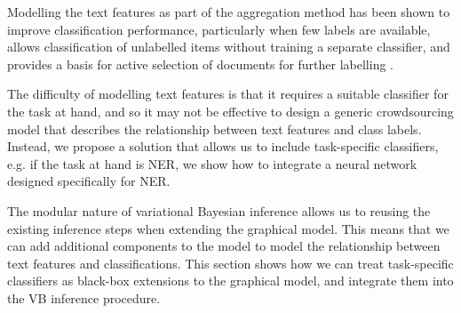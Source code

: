 Modelling the text features as part of the aggregation method has been shown to improve classification performance, particularly when few labels are available, allows classification of unlabelled items without training a separate classifier, and provides a basis for active selection of documents for further labelling \cite{many many things}.

The difficulty of modelling text features is that it requires a suitable classifier for the task at hand, and so it may not be effective to design a generic crowdsourcing model that describes the relationship between text features and class labels. Instead, we propose a solution that allows us to include task-specific classifiers, e.g. if the task at hand is NER, we show how to integrate a neural network designed specifically for NER.

The modular nature of variational Bayesian inference allows us to reusing the existing inference steps when extending the graphical model. This means that we can add additional components to the model to model the relationship between text features and classifications. This section shows how we can treat task-specific classifiers as black-box extensions to the graphical model, and integrate them into the VB inference procedure. 
